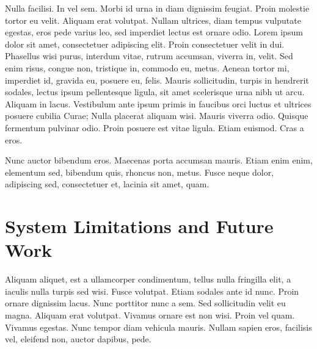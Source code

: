 Nulla facilisi. In vel sem. Morbi id urna in diam dignissim feugiat. Proin molestie tortor eu velit. Aliquam erat volutpat. Nullam ultrices, diam tempus vulputate egestas, eros pede varius leo, sed imperdiet lectus est ornare odio. Lorem ipsum dolor sit amet, consectetuer adipiscing elit. Proin consectetuer velit in dui. Phasellus wisi purus, interdum vitae, rutrum accumsan, viverra in, velit. Sed enim risus, congue non, tristique in, commodo eu, metus. Aenean tortor mi, imperdiet id, gravida eu, posuere eu, felis. Mauris sollicitudin, turpis in hendrerit sodales, lectus ipsum pellentesque ligula, sit amet scelerisque urna nibh ut arcu. Aliquam in lacus. Vestibulum ante ipsum primis in faucibus orci luctus et ultrices posuere cubilia Curae; Nulla placerat aliquam wisi. Mauris viverra odio. Quisque fermentum pulvinar odio. Proin posuere est vitae ligula. Etiam euismod. Cras a eros.

Nunc auctor bibendum eros. Maecenas porta accumsan mauris. Etiam enim enim, elementum sed, bibendum quis, rhoncus non, metus. Fusce neque dolor, adipiscing sed, consectetuer et, lacinia sit amet, quam.
\section{System Limitations and Future Work}
Aliquam aliquet, est a ullamcorper condimentum, tellus nulla fringilla elit, a iaculis nulla turpis sed wisi. Fusce volutpat. Etiam sodales ante id nunc. Proin ornare dignissim lacus. Nunc porttitor nunc a sem. Sed sollicitudin velit eu magna. Aliquam erat volutpat. Vivamus ornare est non wisi. Proin vel quam. Vivamus egestas. Nunc tempor diam vehicula mauris. Nullam sapien eros, facilisis vel, eleifend non, auctor dapibus, pede.